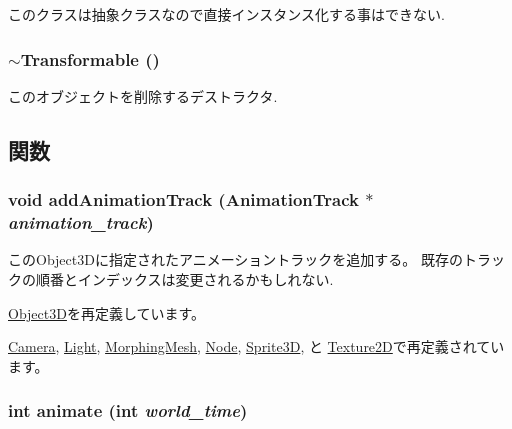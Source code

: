 このクラスは抽象クラスなので直接インスタンス化する事はできない. \hypertarget{classm3g_1_1Transformable_89d9c7912ed11a30a312fd8f72b9ab22}{
\subsubsection[{$\sim$Transformable}]{\setlength{\rightskip}{0pt plus 5cm}$\sim${\bf Transformable} ()}}
\label{classm3g_1_1Transformable_89d9c7912ed11a30a312fd8f72b9ab22}


このオブジェクトを削除するデストラクタ. 

\subsection{関数}
\hypertarget{classm3g_1_1Transformable_415c0b110f95410ded9b85e5d99a496b}{
\subsubsection[{addAnimationTrack}]{\setlength{\rightskip}{0pt plus 5cm}void addAnimationTrack ({\bf AnimationTrack} $\ast$ {\em animation\_\-track})}}
\label{classm3g_1_1Transformable_415c0b110f95410ded9b85e5d99a496b}


このObject3Dに指定されたアニメーショントラックを追加する。 既存のトラックの順番とインデックスは変更されるかもしれない. 

\hyperlink{classm3g_1_1Object3D_415c0b110f95410ded9b85e5d99a496b}{Object3D}を再定義しています。

\hyperlink{classm3g_1_1Camera_415c0b110f95410ded9b85e5d99a496b}{Camera}, \hyperlink{classm3g_1_1Light_415c0b110f95410ded9b85e5d99a496b}{Light}, \hyperlink{classm3g_1_1MorphingMesh_415c0b110f95410ded9b85e5d99a496b}{MorphingMesh}, \hyperlink{classm3g_1_1Node_415c0b110f95410ded9b85e5d99a496b}{Node}, \hyperlink{classm3g_1_1Sprite3D_415c0b110f95410ded9b85e5d99a496b}{Sprite3D}, と \hyperlink{classm3g_1_1Texture2D_415c0b110f95410ded9b85e5d99a496b}{Texture2D}で再定義されています。\hypertarget{classm3g_1_1Transformable_8aad1ceab4c2a03609c8a42324ce484d}{
\subsubsection[{animate}]{\setlength{\rightskip}{0pt plus 5cm}int animate (int {\em world\_\-time})}}
\label{classm3g_1_1Transformable_8aad1ceab4c2a03609c8a42324ce484d}


